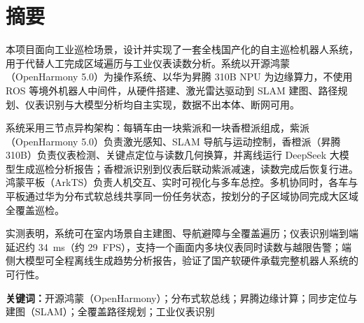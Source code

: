 \chapter*{摘\quad 要}

本项目面向工业巡检场景，设计并实现了一套全栈国产化的自主巡检机器人系统，用于代替人工完成区域遍历与工业仪表读数分析。系统以开源鸿蒙（OpenHarmony 5.0）为操作系统、以华为昇腾 310B NPU 为边缘算力，不使用 ROS 等境外机器人中间件，从硬件搭建、激光雷达驱动到 SLAM 建图、路径规划、仪表识别与大模型分析均自主实现，数据不出本体、断网可用。

系统采用三节点异构架构：每辆车由一块紫派和一块香橙派组成，紫派（OpenHarmony 5.0）负责激光感知、SLAM 导航与运动控制，香橙派（昇腾 310B）负责仪表检测、关键点定位与读数几何换算，并离线运行 DeepSeek 大模型生成巡检分析报告；香橙派识别到仪表后联动紫派减速，读数完成后恢复行进。鸿蒙平板（ArkTS）负责人机交互、实时可视化与多车总控。多机协同时，各车与平板通过华为分布式软总线共享同一份任务状态，按划分的子区域协同完成大区域全覆盖巡检。

实测表明，系统可在室内场景自主建图、导航避障与全覆盖遍历；仪表识别端到端延迟约 34~ms（约 29~FPS），支持一个画面内多块仪表同时读数与越限告警；端侧大模型可全程离线生成趋势分析报告，验证了国产软硬件承载完整机器人系统的可行性。

\vspace{1.5em}
\noindent\textbf{关键词：}开源鸿蒙（OpenHarmony）；分布式软总线；昇腾边缘计算；同步定位与建图（SLAM）；全覆盖路径规划；工业仪表识别
